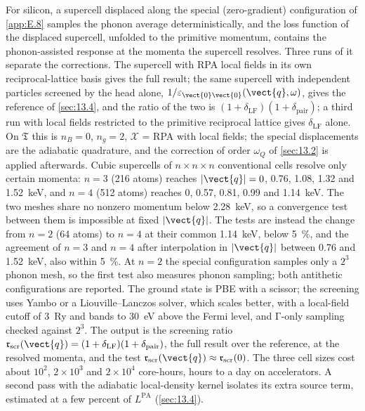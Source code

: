 For silicon, a supercell displaced along the special (zero-gradient) configuration of \cref{app:E.8} samples the phonon average deterministically, and the loss function of the displaced supercell, unfolded to the primitive momentum, contains the phonon-assisted response at the momenta the supercell resolves. Three runs of it separate the corrections. The supercell with RPA local fields in its own reciprocal-lattice basis gives the full result; the same supercell with independent particles screened by the head alone, $1/\varepsilon_{\vect{0}\vect{0}}(\vect{q},\omega)$, gives the reference of \cref{sec:13.4}, and the ratio of the two is $(1 + \delta_{\mathrm{LF}})(1 + \delta_{\mathrm{pair}})$; a third run with local fields restricted to the primitive reciprocal lattice gives $\delta_{\mathrm{LF}}$ alone. On $\mathfrak{T}$ this is $n_B = 0$, $n_g = 2$, $\mathcal{X}$ = RPA with local fields; the special displacements are the adiabatic quadrature, and the correction of order $\omega_Q$ of \cref{sec:13.2} is applied afterwards. Cubic supercells of $n\times n\times n$ conventional cells resolve only certain momenta: $n = 3$ (216 atoms) reaches $|\vect{q}| = 0$, 0.76, 1.08, 1.32 and \SI{1.52}{keV}, and $n = 4$ (512 atoms) reaches 0, 0.57, 0.81, 0.99 and \SI{1.14}{keV}. The two meshes share no nonzero momentum below \SI{2.28}{keV}, so a convergence test between them is impossible at fixed $|\vect{q}|$. The tests are instead the change from $n = 2$ (64 atoms) to $n = 4$ at their common \SI{1.14}{keV}, below \SI{5}{\percent}, and the agreement of $n = 3$ and $n = 4$ after interpolation in $|\vect{q}|$ between 0.76 and \SI{1.52}{keV}, also within \SI{5}{\percent}. At $n = 2$ the special configuration samples only a $2^3$ phonon mesh, so the first test also measures phonon sampling; both antithetic configurations are reported. The ground state is PBE with a scissor; the screening uses Yambo or a Liouville--Lanczos solver, which scales better, with a local-field cutoff of \SI{3}{Ry} and bands to \SI{30}{eV} above the Fermi level, and $\mathrm{\Gamma}$-only sampling checked against $2^3$. The output is the screening ratio $\mathfrak{r}_{\mathrm{scr}}(\vect{q}) = (1 + \delta_{\mathrm{LF}})(1 + \delta_{\mathrm{pair}})$, the full result over the reference, at the resolved momenta, and the test $\mathfrak{r}_{\mathrm{scr}}(\vect{q}) \approx \mathfrak{r}_{\mathrm{scr}}(0)$. The three cell sizes cost about $10^2$, $2\times10^3$ and $2\times10^4$ core-hours, hours to a day on accelerators. A second pass with the adiabatic local-density kernel isolates its extra source term, estimated at a few percent of $L^{\mathrm{PA}}$ (\cref{sec:13.4}).


